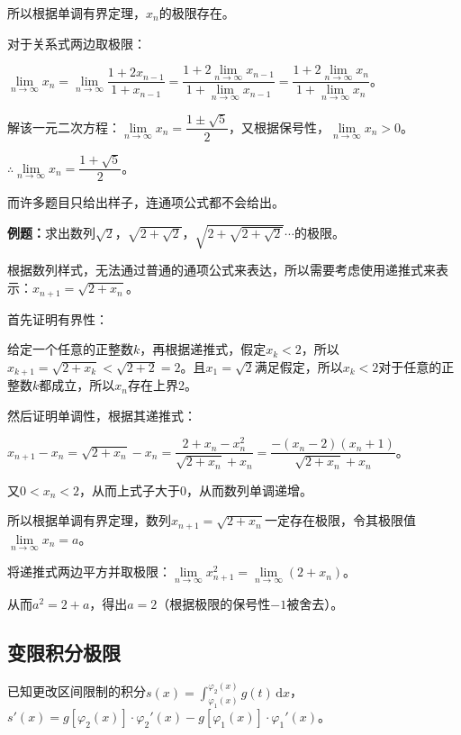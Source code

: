 \documentclass[UTF8, 12pt]{ctexart}
\begin{document}
所以根据单调有界定理，$x_n$的极限存在。

对于关系式两边取极限：

$\lim\limits_{n\to\infty}x_n=\lim\limits_{n\to\infty}\dfrac{1+2x_{n-1}}{1+x_{n-1}}=\dfrac{1+2\lim\limits_{n\to\infty}x_{n-1}}{1+\lim\limits_{n\to\infty}x_{n-1}}=\dfrac{1+2\lim\limits_{n\to\infty}x_n}{1+\lim\limits_{n\to\infty}x_n}$。

解该一元二次方程：$\lim\limits_{n\to\infty}x_n=\dfrac{1\pm\sqrt{5}}{2}$，又根据保号性，$\lim\limits_{n\to\infty}x_n>0$。

$\therefore\lim\limits_{n\to\infty}x_n=\dfrac{1+\sqrt{5}}{2}$。

而许多题目只给出样子，连通项公式都不会给出。\medskip

\textbf{例题：}求出数列$\sqrt{2}$，$\sqrt{2+\sqrt{2}}$，$\sqrt{2+\sqrt{2+\sqrt{2}}}$$\cdots$的极限。

根据数列样式，无法通过普通的通项公式来表达，所以需要考虑使用递推式来表示：$x_{n+1}=\sqrt{2+x_n}$。

首先证明有界性：

给定一个任意的正整数$k$，再根据递推式，假定$x_k<2$，所以$x_{k+1}=\sqrt{2+x_k}<\sqrt{2+2}=2$。且$x_1=\sqrt{2}$满足假定，所以$x_k<2$对于任意的正整数$k$都成立，所以$x_n$存在上界2。

然后证明单调性，根据其递推式：

$x_{n+1}-x_n=\sqrt{2+x_n}-x_n=\dfrac{2+x_n-x_n^2}{\sqrt{2+x_n}+x_n}=\dfrac{-(x_n-2)(x_n+1)}{\sqrt{2+x_n}+x_n}$。\medskip

又$0<x_n<2$，从而上式子大于0，从而数列单调递增。

所以根据单调有界定理，数列$x_{n+1}=\sqrt{2+x_n}$一定存在极限，令其极限值$\lim\limits_{n\to\infty}x_n=a$。

将递推式两边平方并取极限：$\lim\limits_{n\to\infty}x^2_{n+1}=\lim\limits_{n\to\infty}(2+x_n)$。

从而$a^2=2+a$，得出$a=2$（根据极限的保号性$-1$被舍去）。

\subsection{变限积分极限}

已知更改区间限制的积分$s(x)=\int_{\varphi_1(x)}^{\varphi_2(x)}g(t)\,\textrm{d}x$，$s'(x)=g[\varphi_2(x)]\cdot\varphi_2'(x)-g[\varphi_1(x)]\cdot\varphi_1'(x)$。
\end{document}
